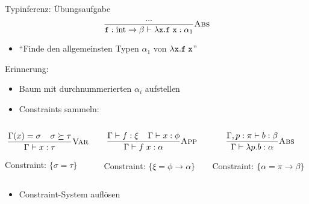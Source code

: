 \documentclass{beamer}
\begin{document}
\begin{frame}{Typinferenz: Übungsaufgabe}
	\begin{equation*}
		\typeRule{Abs}{
			...
		}{
			\texttt{f} : \textrm{int} \to \beta \vdash \abs{\texttt{x}}{\liin{\texttt{f}}{\texttt{x}}} : \alpha_1
		}
	\end{equation*}

	\begin{itemize}
		\item \enquote{Finde den allgemeinsten Typen $\alpha_1$ von $\abs{\texttt{x}}{\liin{\texttt{f}}{\texttt{x}}}$}
	\end{itemize}

	Erinnerung:

	\begin{itemize}
		\item Baum mit durchnummerierten $\alpha_i$ aufstellen
		\item Constraints sammeln:
	\end{itemize}

	\begin{columns}
		\scriptsize
		\begin{column}{0.3\textwidth}
			\begin{equation*}
			\typeRule{Var}{
				\Gamma(x) = \sigma
				\;\;\;\;
				\sigma \succeq \tau
			}{
				\Gamma \vdash x : \tau
			}
			\end{equation*}

			Constraint: $\{ \sigma = \tau \}$
		\end{column}
		\begin{column}{0.3\textwidth}
			\begin{equation*}
			\typeRule{App}{
				\Gamma \vdash f : \xi
				\;\;\;\;
				\Gamma \vdash x : \phi
			}{
				\Gamma \vdash \liin{f}{x} : \alpha
			}
			\end{equation*}

			Constraint: $\{ \xi = \phi \to \alpha \}$
		\end{column}
		\begin{column}{0.3\textwidth}
			\begin{equation*}
			\typeRule{Abs}{
				\Gamma, p : \pi \vdash b : \beta
			}{
				\Gamma \vdash \abs{p}{b} : \alpha
			}
			\end{equation*}

			Constraint: $\{ \alpha = \pi \to \beta \}$
		\end{column}
	\end{columns}

	\begin{itemize}
		\item Constraint-System auflösen
	\end{itemize}
\end{frame}
\end{document}
